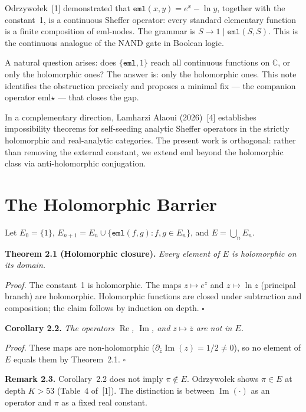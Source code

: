 \documentclass[11pt,a4paper]{article}
\begin{document}
Odrzywołek~[1] demonstrated that $\texttt{eml}(x, y) = e^x - \ln y$, together with the constant~1, is a continuous Sheffer operator: every standard elementary function is a finite composition of eml-nodes. The grammar is $S \to 1 \mid \texttt{eml}(S, S)$. This is the continuous analogue of the NAND gate in Boolean logic.

A natural question arises: does $\{\texttt{eml}, 1\}$ reach all continuous functions on $\mathbb{C}$, or only the holomorphic ones? The answer is: only the holomorphic ones. This note identifies the obstruction precisely and proposes a minimal fix --- the companion operator eml$\star$ --- that closes the gap.

In a complementary direction, Lamharzi Alaoui (2026)~[4] establishes impossibility theorems for self-seeding analytic Sheffer operators in the strictly holomorphic and real-analytic categories. The present work is orthogonal: rather than removing the external constant, we extend eml beyond the holomorphic class via anti-holomorphic conjugation.

\section{The Holomorphic Barrier}

Let $E_0 = \{1\}$, $E_{n+1} = E_n \cup \{\texttt{eml}(f, g) : f, g \in E_n\}$, and $E = \bigcup_n E_n$.

\textbf{Theorem 2.1 (Holomorphic closure).} \textit{Every element of $E$ is holomorphic on its domain.}

\textit{Proof.} The constant~1 is holomorphic. The maps $z \mapsto e^z$ and $z \mapsto \ln z$ (principal branch) are holomorphic. Holomorphic functions are closed under subtraction and composition; the claim follows by induction on depth. $\square$

\textbf{Corollary 2.2.} \textit{The operators $\operatorname{Re}$, $\operatorname{Im}$, and $z \mapsto \overline{z}$ are not in $E$.}

\textit{Proof.} These maps are non-holomorphic ($\partial_{\overline{z}} \operatorname{Im}(z) = 1/2 \neq 0$), so no element of $E$ equals them by Theorem~2.1. $\square$

\textbf{Remark 2.3.} Corollary~2.2 does not imply $\pi \notin E$. Odrzywołek shows $\pi \in E$ at depth $K > 53$ (Table~4 of~[1]). The distinction is between $\operatorname{Im}(\cdot)$ as an operator and $\pi$ as a fixed real constant.
\end{document}
